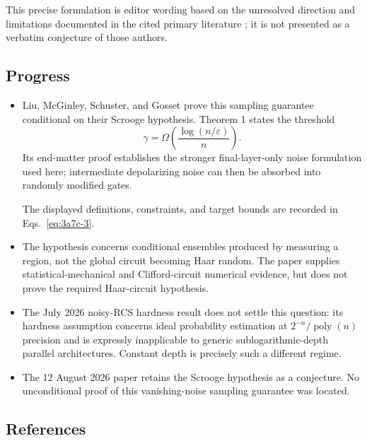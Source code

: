 This precise formulation is editor wording based on the unresolved direction and limitations documented in the cited primary literature ; it is not presented as a verbatim conjecture of those authors.

\subsection*{Progress}

\begin{itemize}
  \item Liu, McGinley, Schuster, and Gosset prove this sampling guarantee conditional on their Scrooge hypothesis. Theorem 1 states the threshold
  \begin{equation}
\gamma=\Omega\!\left(\frac{\log(n/\varepsilon)}n\right).
\label{eq:3a7c-3}
\end{equation}
  Its end-matter proof establishes the stronger final-layer-only noise formulation used here; intermediate depolarizing noise can then be absorbed into randomly modified gates. 

The displayed definitions, constraints, and target bounds are recorded in Eqs.~\eqref{eq:3a7c-3}.

  \item The hypothesis concerns conditional ensembles produced by measuring a region, not the global circuit becoming Haar random. The paper supplies statistical-mechanical and Clifford-circuit numerical evidence, but does not prove the required Haar-circuit hypothesis. 

  \item The July 2026 noisy-RCS hardness result does not settle this question: its hardness assumption concerns ideal probability estimation at $2^{-n}/\operatorname{poly}(n)$ precision and is expressly inapplicable to generic sublogarithmic-depth parallel architectures. Constant depth is precisely such a different regime. 

  \item The 12 August 2026 paper retains the Scrooge hypothesis as a conjecture. No unconditional proof of this vanishing-noise sampling guarantee was located. 
\end{itemize}

\subsection*{References}

